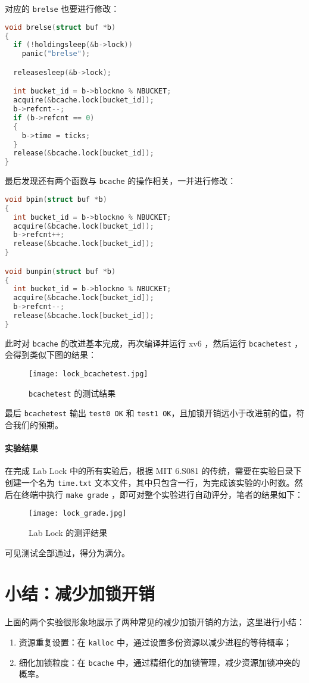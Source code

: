 对应的 \lstinline{brelse} 也要进行修改：
\begin{lstlisting}[language=C]
void brelse(struct buf *b)
{
  if (!holdingsleep(&b->lock))
    panic("brelse");

  releasesleep(&b->lock);

  int bucket_id = b->blockno % NBUCKET;
  acquire(&bcache.lock[bucket_id]);
  b->refcnt--;
  if (b->refcnt == 0)
  {
    b->time = ticks;
  }
  release(&bcache.lock[bucket_id]);
}
\end{lstlisting}

最后发现还有两个函数与 \lstinline{bcache} 的操作相关，一并进行修改：
\begin{lstlisting}[language=C]
void bpin(struct buf *b)
{
  int bucket_id = b->blockno % NBUCKET;
  acquire(&bcache.lock[bucket_id]);
  b->refcnt++;
  release(&bcache.lock[bucket_id]);
}

void bunpin(struct buf *b)
{
  int bucket_id = b->blockno % NBUCKET;
  acquire(&bcache.lock[bucket_id]);
  b->refcnt--;
  release(&bcache.lock[bucket_id]);
}
\end{lstlisting}

此时对 \lstinline{bcache} 的改进基本完成，再次编译并运行 xv6 ，然后运行 \lstinline{bcachetest} ，会得到类似下图的结果：
\begin{figure}[H]
  \centering
  \texttt{[image: lock\_bcachetest.jpg]}
  \caption{ \lstinline{bcachetest} 的测试结果}
\end{figure}
最后 \lstinline{bcachetest} 输出 \lstinline{test0 OK} 和 \lstinline{test1 OK}，且加锁开销远小于改进前的值，符合我们的预期。

\paragraph*{实验结果} 在完成 Lab Lock 中的所有实验后，根据 MIT 6.S081 的传统，需要在实验目录下创建一个名为 \lstinline{time.txt} 文本文件，其中只包含一行，为完成该实验的小时数。然后在终端中执行 \lstinline{make grade} ，即可对整个实验进行自动评分，笔者的结果如下：
\begin{figure}[H]
  \centering
  \texttt{[image: lock\_grade.jpg]}
  \caption{ Lab Lock 的测评结果}
\end{figure}
可见测试全部通过，得分为满分。

\section{小结：减少加锁开销}

上面的两个实验很形象地展示了两种常见的减少加锁开销的方法，这里进行小结：
\begin{enumerate}
    \item 资源重复设置：在 \lstinline{kalloc} 中，通过设置多份资源以减少进程的等待概率；
    \item 细化加锁粒度：在 \lstinline{bcache} 中，通过精细化的加锁管理，减少资源加锁冲突的概率。
\end{enumerate}


